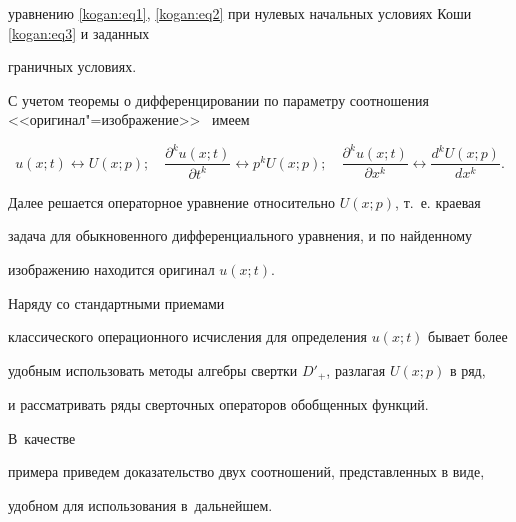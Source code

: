 уравнению \eqref{kogan:eq1}, \eqref{kogan:eq2} при нулевых начальных условиях Коши \eqref{kogan:eq3} и заданных 

граничных условиях. 

С учетом теоремы о дифференцировании по параметру  соотношения <<оригинал"=изображение>>~\cite{kogan:bib16} имеем

\begin{equation}

\label{kogan:eq28}

u(x;t)\leftrightarrow U(x;p);

\quad

\frac{\partial^ ku(x;t)}{\partial t^k}\leftrightarrow p^kU(x;p);

\quad

\frac{\partial ^ku(x;t)}{\partial x^k}\leftrightarrow 

\frac{d^kU(x;p)}{dx^k}.

\end{equation}



Далее решается операторное уравнение относительно $U(x;p)$, т.~е. краевая 

задача для обыкновенного дифференциального уравнения, и по найденному 

изображению находится оригинал $u(x;t)$. 

Наряду со стандартными приемами 

классического операционного исчисления для определения $u(x;t)$ бывает более 

удобным использовать методы алгебры свертки $D'_+$, разлагая $U(x;p)$ в ряд,

и рассматривать ряды сверточных операторов обобщенных функций. 

В~качестве 

примера приведем доказательство двух соотношений, представленных в виде, 

удобном для использования в~дальнейшем. 



\smallskip



